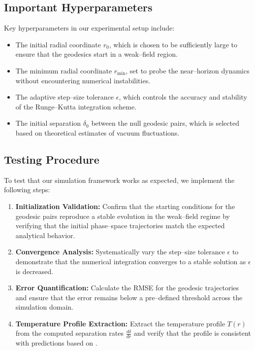 \documentclass{article}\usepackage[utf8]{inputenc} %
\begin{document}
\subsection{Important Hyperparameters}
Key hyperparameters in our experimental setup include:
\begin{itemize}
    \item The initial radial coordinate $r_{0}$, which is chosen to be sufficiently large to ensure that the geodesics start in a weak--field region.
    \item The minimum radial coordinate $r_{\mathrm{min}}$, set to probe the near--horizon dynamics without encountering numerical instabilities.
    \item The adaptive step--size tolerance $\epsilon$, which controls the accuracy and stability of the Runge--Kutta integration scheme.
    \item The initial separation $\delta_{0}$ between the null geodesic pairs, which is selected based on theoretical estimates of vacuum fluctuations.
\end{itemize}

\subsection{Testing Procedure}
To test that our simulation framework works as expected, we implement the following steps:
\begin{enumerate}
    \item \textbf{Initialization Validation:} Confirm that the starting conditions for the geodesic pairs reproduce a stable evolution in the weak--field regime by verifying that the initial phase--space trajectories match the expected analytical behavior.
    \item \textbf{Convergence Analysis:} Systematically vary the step--size tolerance $\epsilon$ to demonstrate that the numerical integration converges to a stable solution as $\epsilon$ is decreased.
    \item \textbf{Error Quantification:} Calculate the RMSE for the geodesic trajectories and ensure that the error remains below a pre--defined threshold across the simulation domain.
    \item \textbf{Temperature Profile Extraction:} Extract the temperature profile $T(r)$ from the computed separation rates $\frac{d\delta}{dr}$ and verify that the profile is consistent with predictions based on \cite{Unruh1976}.
\end{enumerate}
\end{document}
